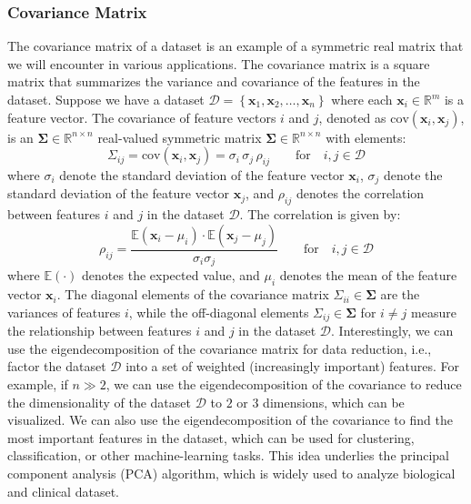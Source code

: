 \documentclass{article}[11pt]
\def\R{\mathbb{R}}
\def\D{\mathcal{D}}
\begin{document}
\subsubsection*{Covariance Matrix}
The covariance matrix of a dataset is an example of a symmetric real matrix that we will encounter in various applications.
The covariance matrix is a square matrix that summarizes the variance and covariance of the features in the dataset.
Suppose we have a dataset $\D = \left\{\mathbf{x}_{1},\mathbf{x}_{2},\dots,\mathbf{x}_{n}\right\}$ where each $\mathbf{x}_{i}\in\mathbb{R}^{m}$ is a feature vector.
The covariance of feature vectors $i$ and $j$, denoted as $\text{cov}\left(\mathbf{x}_{i},\mathbf{x}_{j}\right)$, is an $\mathbf{\Sigma}\in\mathbb{R}^{n\times{n}}$ 
real-valued symmetric matrix $\mathbf{\Sigma}\in\R^{n\times{n}}$ with elements: 
\begin{equation}
    \Sigma_{ij} = \text{cov}\left(\mathbf{x}_{i},\mathbf{x}_{j}\right) = \sigma_{i}\,\sigma_{j}\,\rho_{ij}\qquad\text{for}\quad{i,j \in \mathcal{D}}
\end{equation}
where $\sigma_{i}$ denote the standard deviation of the feature vector $\mathbf{x}_{i}$, $\sigma_{j}$ denote the standard deviation of the 
feature vector $\mathbf{x}_{j}$, and $\rho_{ij}$ denotes the correlation between features $i$ and $j$ in the dataset $\D$. The correlation is given by:
\begin{equation}
\rho_{ij} = \frac{\mathbb{E}(\mathbf{x}_{i}-\mu_{i})\cdot\mathbb{E}(\mathbf{x}_{j} - \mu_{j})}{\sigma_{i}\sigma_{j}}\qquad\text{for}\quad{i,j \in \mathcal{D}}
\end{equation}
where $\mathbb{E}(\cdot)$ denotes the expected value, and $\mu_{i}$ denotes the mean of the feature vector $\mathbf{x}_{i}$.
The diagonal elements of the covariance matrix $\Sigma_{ii}\in\mathbf{\Sigma}$ are the variances of features $i$,
while the off-diagonal elements $\Sigma_{ij}\in\mathbf{\Sigma}$ for $i\neq{j}$ measure the relationship between features 
$i$ and $j$ in the dataset $\mathcal{D}$. Interestingly, we can use the eigendecomposition of the covariance matrix for data reduction, 
i.e., factor the dataset $\D$ into a set of weighted (increasingly important) features. For example, if $n\gg{2}$, 
we can use the eigendecomposition of the covariance to reduce the dimensionality of the dataset $\D$ to $2$ or $3$ dimensions, which can be visualized.
We can also use the eigendecomposition of the covariance to find the most important features in the dataset, which can be used for clustering, classification, or other machine-learning tasks.
This idea underlies the principal component analysis (PCA) algorithm, which is widely used to analyze biological and clinical dataset.
\end{document}
